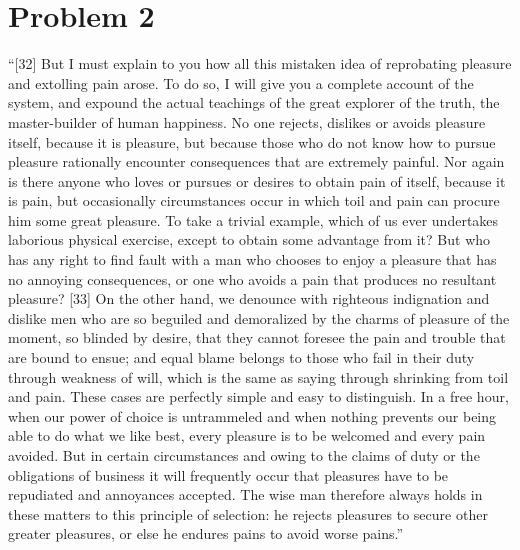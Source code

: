 \documentclass[letterpaper]{article}
\begin{document}
\section*{Problem 2}
\begin{ddanger}
  ``[32] But I must explain to you how all this mistaken idea of reprobating pleasure and extolling pain arose.
  To do so, I will give you a complete account of the system, and expound the actual teachings of the great explorer of the truth, the master-builder of human happiness.
  No one rejects, dislikes or avoids pleasure itself, because it is pleasure, but because those who do not know how to pursue pleasure rationally encounter consequences that are extremely painful.
  Nor again is there anyone who loves or pursues or desires to obtain pain of itself, because it is pain, but occasionally circumstances occur in which toil and pain can procure him some great pleasure.
  To take a trivial example, which of us ever undertakes laborious physical exercise, except to obtain some advantage from it?
  But who has any right to find fault with a man who chooses to enjoy a pleasure that has no annoying consequences, or one who avoids a pain that produces no resultant pleasure?
  [33] On the other hand, we denounce with righteous indignation and dislike men who are so beguiled and demoralized by the charms of pleasure of the moment, so blinded by desire, that they cannot foresee the pain and trouble that are bound to ensue; and equal blame belongs to those who fail in their duty through weakness of will, which is the same as saying through shrinking from toil and pain.
  These cases are perfectly simple and easy to distinguish.
  In a free hour, when our power of choice is untrammeled and when nothing prevents our being able to do what we like best, every pleasure is to be welcomed and every pain avoided.
  But in certain circumstances and owing to the claims of duty or the obligations of business it will frequently occur that pleasures have to be repudiated and annoyances accepted.
  The wise man therefore always holds in these matters to this principle of selection: he rejects pleasures to secure other greater pleasures, or else he endures pains to avoid worse pains.''~\cite{book:lorem_ipsum}\hfill{}
\end{ddanger}

\printbibliography
\end{document}
